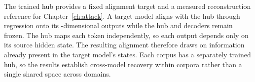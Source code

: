 The trained hub provides a fixed alignment target and a measured reconstruction reference for Chapter~\ref{ch:attack}.
A target model aligns with the hub through regression onto its -dimensional outputs while the hub and decoders remain frozen.
The hub maps each token independently, so each output depends only on its source hidden state.
The resulting alignment therefore draws on information already present in the target model's states.
Each corpus has a separately trained hub, so the results establish cross-model recovery within corpora rather than a single shared space across domains.




